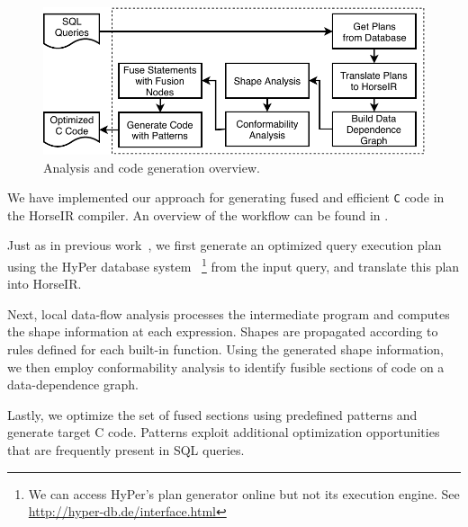 \begin{figure}[htbp]
\centering
\includegraphics[width=\columnwidth]{./src/figure/overview-v4.pdf}
\caption{Analysis and code generation overview.} \label{fig:overview}
\end{figure}

We have implemented our approach for generating fused and efficient
\texttt{C} code in the HorseIR compiler. An overview of the workflow
can be found in .

Just as in previous work~\OldPaper, we first generate an optimized
query execution plan using the HyPer database system~\cite{Neumann2011:HyPer}
\footnote{We can access HyPer's plan generator online but
not its execution engine.  See \url{http://hyper-db.de/interface.html}}
from the input query, and translate this plan into HorseIR.

Next, local data-flow analysis processes the intermediate program and
computes the shape information at each expression. Shapes are propagated
according to rules defined for each built-in function. Using the
generated shape information, we then employ conformability analysis to
identify fusible sections of code on a data-dependence graph.

Lastly, we optimize the set of fused sections using predefined patterns
and generate target C code. Patterns exploit additional optimization
opportunities that are frequently present in SQL queries.
